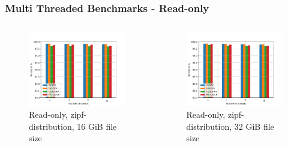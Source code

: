 \documentclass[
	aspectratio=169,
	compress,
]{beamer}
\newcommand{\navframetitle}[1]{\frametitle{#1\hfill{\footnotesize\lastsection{}}}}
\begin{document}

\begin{frame}[fragile]
	\navframetitle{Multi Threaded Benchmarks - Read-only}

	\begin{columns}
		\begin{column}{0.5\textwidth}
			\begin{figure}[ht]
    			\centering
    			\includegraphics[width=\textwidth]{multi_16_gb_randread_zipf.jpg}
        		\caption{Read-only, zipf-distribution, 16 GiB file size}
			\end{figure}
		\end{column}
		\begin{column}{0.5\textwidth}
			\begin{figure}[ht]
    			\centering
    			\includegraphics[width=\textwidth]{multi_32_gb_randread_zipf.jpg}
        		\caption{Read-only, zipf-distribution, 32 GiB file size}
			\end{figure}			
		\end{column}
	\end{columns}
\end{frame}
\end{document}
